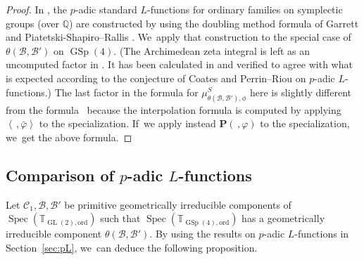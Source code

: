\documentclass[JEP,XML,SOM,Unicode,published]{cedram}
\newcommand{\Lfunctions}{$L$\nobreakdash-func\-tions\xspace}
\theoremstyle{plain}
\theoremstyle{remark}
\newcommand{\bQ}{\mathbb{Q}}
\newcommand{\bT}{\mathbb{T}}
\newcommand{\sB}{\mathscr{B}}
\newcommand{\sC}{\mathscr{C}}
\newcommand{\bfP}{\mathbf{P}}
\DeclareMathOperator{\GL}{GL}
\DeclareMathOperator{\GSp}{GSp}
\newcommand{\ord}{\mathrm{ord}}
\DeclareMathOperator{\Spec}{Spec}
\begin{document}
\begin{proof}
In \cite{SLF}, the $p$-adic standard \Lfunctions for ordinary families on symplectic groups (over $\bQ$) are constructed by using the doubling method formula of Garrett \cite{GaPull} and Piatetski-Shapiro--Rallis \cite{PSR}. We~apply that construction to the special case of $\theta(\sB,\sB')$ on $\GSp(4)$. (The Archimedean zeta integral is left as an uncomputed factor in \loccit. It has been calculated in \cite{AZI} and verified to agree with what is expected according to the conjecture of Coates and Perrin--Riou on $p$\nobreakdash-adic \Lfunctions.) The last factor in the formula for $\mu^S_{\theta(\sB,\sB'),\phi}$ here is slightly different from the formula~\cite[(7.0.1)]{SLF} because the interpolation formula is computed by applying $\left<\,,\bar{\varphi}\right>$ to the specialization. If~we apply instead $\bfP(\,,\varphi)$ to the specialization, we~get the above formula.
\end{proof}

\subsection{Comparison of \texorpdfstring{$p$-adic \protect\Lfunctions}{pL}}\label{sec:compare}
Let $\sC_1,\sB,\sB'$ be primitive geometrically irreducible components of $\Spec(\bT_{\GL(2),\ord})$ such that $\Spec(\bT_{\GSp(4),\ord})$ has a geometrically irreducible component $\theta(\sB,\sB')$. By using the results on $p$-adic \Lfunctions in Section~\ref{sec:pL}, we~can deduce the following proposition.
\end{document}
